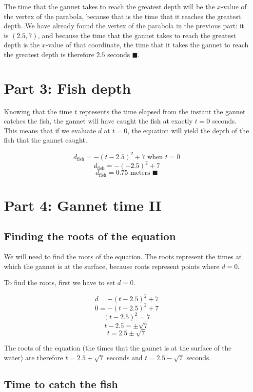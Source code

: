 \documentclass[12pt]{article}
\begin{document}
The time that the gannet takes to reach the greatest depth will be the $x$-value of the vertex of the parabola, because that is the time that it reaches the greatest depth.
We have already found the vertex of the parabola in the previous part: it is $(2.5, 7)$, and because the time that the gannet takes to reach the greatest depth is the $x$-value of that coordinate, the time that it takes the gannet to reach the greatest depth is therefore $2.5$ seconds $\blacksquare$.

\section{Part 3: Fish depth}

Knowing that the time $t$ represents the time elapsed from the instant the gannet catches the fish, the gannet will have caught the fish at exactly $t = 0$ seconds.
This means that if we evaluate $d$ at $t = 0$, the equation will yield the depth of the fish that the gannet caught.

\[
d_{\text{fish}} = -(t - 2.5)^2 + 7 \text{ when } t = 0
\]
\[
d_{\text{fish}} = -(-2.5)^2 + 7
\]
\[
d_{\text{fish}} = 0.75\text{ meters } \blacksquare
\]

\newpage

\section{Part 4: Gannet time II}

\subsection{Finding the roots of the equation}

We will need to find the roots of the equation.
The roots represent the times at which the gannet is at the surface, because roots represent points where $d=0$.

To find the roots, first we have to set $d=0$.

\[
d = -(t - 2.5)^2 + 7
\]
\[
0 = -(t - 2.5)^2 + 7
\]
\[
(t - 2.5)^2 = 7
\]
\[
t - 2.5 = \pm \sqrt{7}
\]
\[
t = 2.5 \pm \sqrt{7}
\]

The roots of the equation (the times that the gannet is at the surface of the water) are therefore $t = 2.5 + \sqrt{7}$ seconds and $t = 2.5 - \sqrt{7}$ seconds.

\subsection{Time to catch the fish}
\end{document}
